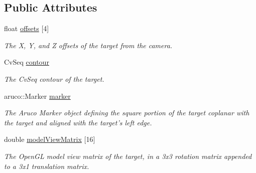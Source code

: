 \subsection*{Public Attributes}
\begin{DoxyCompactItemize}
\item 
float \hyperlink{classTarget_af1714dc10beafcd323003e43d787f7ab}{offsets} \mbox{[}4\mbox{]}
\begin{DoxyCompactList}\small\item\em The X, Y, and Z offsets of the target from the camera. \item\end{DoxyCompactList}\item 
CvSeq \hyperlink{classTarget_a5ea4a01adfb55ca0a5a7355472e02019}{contour}
\begin{DoxyCompactList}\small\item\em The CvSeq contour of the target. \item\end{DoxyCompactList}\item 
aruco::Marker \hyperlink{classTarget_a631383ffe78165e8af649470edb77986}{marker}
\begin{DoxyCompactList}\small\item\em The Aruco Marker object defining the square portion of the target coplanar with the target and aligned with the target's left edge. \item\end{DoxyCompactList}\item 
double \hyperlink{classTarget_acfcc0fcb67b56b407f7842871306c0ae}{modelViewMatrix} \mbox{[}16\mbox{]}
\begin{DoxyCompactList}\small\item\em The OpenGL model view matrix of the target, in a 3x3 rotation matrix appended to a 3x1 translation matrix. \item\end{DoxyCompactList}\end{DoxyCompactItemize}
